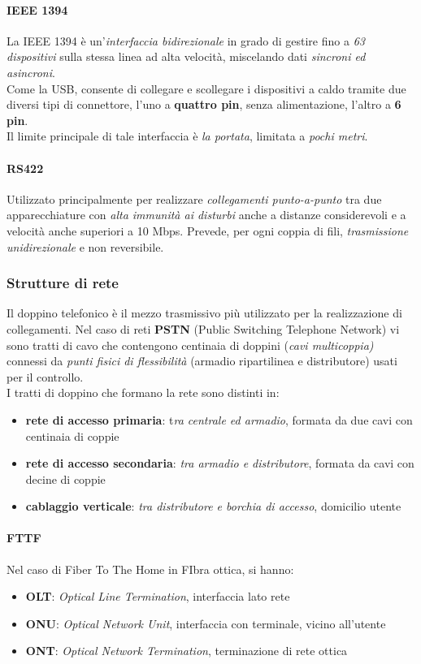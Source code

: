 \documentclass[a4paper,11pt]{article}
\def\para#1{\paragraph{#1}\label{#1}}
\begin{document}
\para{IEEE 1394}
La IEEE 1394 è un'\textit{interfaccia bidirezionale }in grado di gestire fino a \textit{63 dispositivi }sulla stessa linea ad alta velocità, miscelando dati \textit{sincroni ed asincroni}. \\Come la USB, consente di collegare e scollegare i dispositivi a caldo tramite due diversi tipi di connettore, l'uno a \textbf{quattro pin}, senza alimentazione, l'altro a \textbf{6 pin}.\\
Il limite principale di tale interfaccia è \textit{la portata}, limitata a \textit{pochi metri}.
\para{RS422}
Utilizzato principalmente per realizzare \textit{collegamenti punto-a-punto }tra due apparecchiature con \textit{alta immunità ai disturbi }anche a distanze considerevoli e a velocità anche superiori a 10 Mbps.
Prevede, per ogni coppia di fili, \textit{trasmissione unidirezionale }e non reversibile. 
\subsubsection{Strutture di rete}
Il doppino telefonico è il mezzo trasmissivo più utilizzato per la realizzazione di collegamenti. Nel caso di reti \textbf{PSTN} (Public Switching Telephone Network) vi sono tratti di cavo che contengono centinaia di doppini (\textit{cavi multicoppia) }connessi da \textit{punti fisici di flessibilità} (armadio ripartilinea e distributore) usati per il controllo.\\
I tratti di doppino che formano la rete sono distinti in:
\begin{itemize}
\item \textbf{rete di accesso primaria}: t\textit{ra centrale ed armadio}, formata da due cavi con centinaia di coppie
\item\textbf{rete di accesso secondaria}: \textit{tra armadio e distributore}, formata da cavi con decine di coppie
\item\textbf{cablaggio verticale}: \textit{tra distributore e borchia di accesso}, domicilio utente
\end{itemize}
\para{FTTF} Nel caso di Fiber To The Home in FIbra ottica, si hanno:
\begin{itemize}
\item\textbf{OLT}: \textit{Optical Line Termination}, interfaccia lato rete
\item\textbf{ONU}: \textit{Optical Network Unit}, interfaccia con terminale, vicino all'utente
\item\textbf{ONT}: \textit{Optical Network Termination}, terminazione di rete ottica
\end{itemize}
\end{document}
